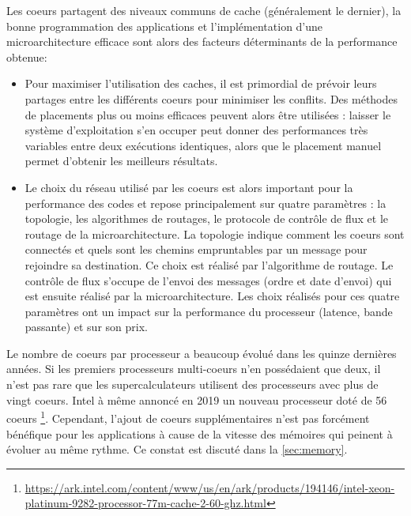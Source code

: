Les coeurs partagent des niveaux communs de cache (généralement le dernier), la bonne programmation des applications et l'implémentation d'une microarchitecture efficace sont alors des facteurs déterminants de la performance obtenue:
\begin{itemize}
    \item Pour maximiser l'utilisation des caches, il est primordial de prévoir leurs partages entre les différents coeurs pour minimiser les conflits. Des méthodes de placements plus ou moins efficaces peuvent alors être utilisées \cite{mazouz2011performance}: laisser le système d'exploitation s'en occuper peut donner des performances très variables entre deux exécutions identiques, alors que le placement manuel permet d'obtenir les meilleurs résultats. 
    \item Le choix du réseau utilisé par les coeurs est alors important pour la performance des codes et repose principalement sur quatre paramètres \cite{peh2009chip} : la topologie, les algorithmes de routages, le protocole de contrôle de flux et le routage de la microarchitecture. La topologie indique comment les coeurs sont connectés et quels sont les chemins empruntables par un message pour rejoindre sa destination. Ce choix est réalisé par l’algorithme de routage. Le contrôle de flux s’occupe de l'envoi des messages (ordre et date d’envoi) qui est ensuite réalisé par la microarchitecture. Les choix réalisés pour ces quatre paramètres ont un impact sur la performance du processeur (latence, bande passante) et sur son prix. 

\end{itemize}

Le nombre de coeurs par processeur a beaucoup évolué dans les quinze dernières années. Si les premiers processeurs multi-coeurs n'en possédaient que deux, il n'est pas rare que les supercalculateurs utilisent des processeurs avec plus de vingt coeurs. Intel à même annoncé en 2019 un nouveau processeur doté de 56 coeurs \footnote{\url{https://ark.intel.com/content/www/us/en/ark/products/194146/intel-xeon-platinum-9282-processor-77m-cache-2-60-ghz.html}}. Cependant, l'ajout de coeurs supplémentaires n'est pas forcément bénéfique pour les applications à cause de la vitesse des mémoires qui peinent à évoluer au même rythme. Ce constat est discuté dans la \autoref{sec:memory}.
